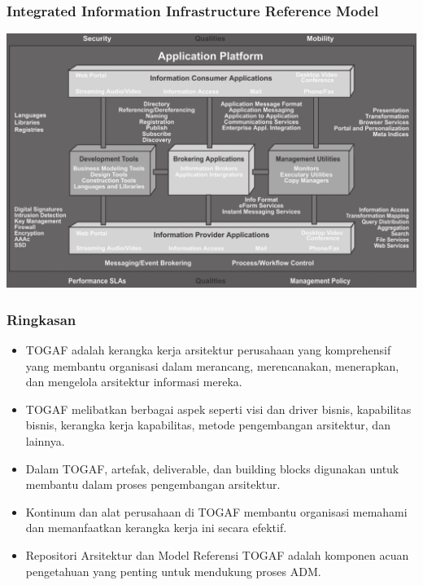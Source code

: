 \documentclass[aspectratio=169]{beamer}
\begin{document}
	{
		\begin{frame}
			\frametitle{Integrated Information Infrastructure Reference Model}
			\begin{center}
				\includegraphics[width=.90\textwidth]{../figures/integrated_information_infrastructure_reference_model}
			\end{center}
		\end{frame}
	}
	
	\begin{frame}
		\frametitle{Ringkasan}
		\begin{itemize}
			\item TOGAF adalah kerangka kerja arsitektur perusahaan yang komprehensif yang membantu organisasi dalam merancang, merencanakan, menerapkan, dan mengelola arsitektur informasi mereka.
			\item TOGAF melibatkan berbagai aspek seperti visi dan driver bisnis, kapabilitas bisnis, kerangka kerja kapabilitas, metode pengembangan arsitektur, dan lainnya.
			\item Dalam TOGAF, artefak, deliverable, dan building blocks digunakan untuk membantu dalam proses pengembangan arsitektur.
			\item Kontinum dan alat perusahaan di TOGAF membantu organisasi memahami dan memanfaatkan kerangka kerja ini secara efektif.
			\item Repositori Arsitektur dan Model Referensi TOGAF adalah komponen acuan pengetahuan yang penting untuk mendukung proses ADM.
		\end{itemize}
	\end{frame}
	
\end{document}
